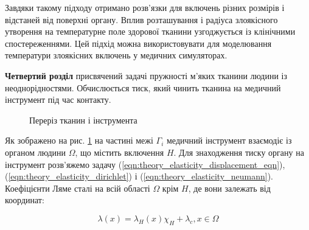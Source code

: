 Завдяки такому підходу отримано розв'язки для включень різних розмірів і відстаней від поверхні органу. Вплив
розташування і радіуса злоякісного утворення на температурне поле здорової тканини узгоджується із клінічними
спостереженнями. Цей підхід можна використовувати для моделювання температури злоякісних включень у медичних
симуляторах.

\textbf{Четвертий розділ} присвячений задачі пружності м'яких тканини людини із неоднорідностями. Обчислюється тиск, 
який чинить тканина на медичний інструмент під час контакту. 

\begin{figure}[ht!]
  \centering
  
  \caption{Переріз тканин і інструмента}
  \label{fig:elasticity_domain}
\end{figure}

Як зображено на рис. \ref{fig:elasticity_domain} на частині межі $\Gamma_i$ медичний інструмент взаємодіє із
органом людини $\Omega$, що містить включення $H$. Для знаходження тиску органу на інструмент розв'яжемо задачу
(\ref{eqn:theory_elasticity_displacement_eqn}), (\ref{eqn:theory_elasticity_dirichlet}) і
(\ref{eqn:theory_elasticity_neumann}). Коефіцієнти Ляме сталі на всій області $\Omega$ крім $H$, де вони залежать 
від координат:

\begin{equation}
  \label{eqn:elasticity_lyame_lambda}
  \lambda(x) = \lambda_H(x)\chi_H + \lambda_c, x \in \Omega
\end{equation}


